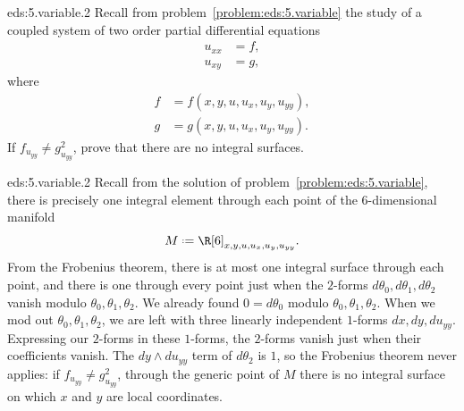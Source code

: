 \begin{problem*}{eds:5.variable.2}
Recall from problem~\vref{problem:eds:5.variable} the study of a coupled system of two  order partial differential equations
\begin{align*}
u_{xx}&=f,\\
u_{xy}&=g,
\end{align*}
where
\begin{align*}
f&=f(x,y,u,u_x,u_y,u_{yy}),\\
g&=g(x,y,u,u_x,u_y,u_{yy}).
\end{align*}
If \(f_{u_{yy}}\ne g_{u_{yy}}^2\), prove that there are no integral surfaces.
\end{problem*}
\begin{answer}{eds:5.variable.2}
Recall from the solution of problem~\vref{problem:eds:5.variable}, there is precisely one integral element through each point of the \(6\)-dimensional manifold
\[
M\defeq\R[6]_{x,y,u,u_x,u_y,u_{yy}}.
\]
From the Frobenius theorem, there is at most one integral surface through each point, and there is one through every point just when the \(2\)-forms \(d\theta_0,d\theta_1,d\theta_2\) vanish modulo \(\theta_0,\theta_1,\theta_2\).
We already found \(0=d\theta_0\) modulo \(\theta_0,\theta_1,\theta_2\).
When we mod out \(\theta_0,\theta_1,\theta_2\), we are left with three linearly independent \(1\)-forms \(dx,dy,du_{yy}\).
Expressing our \(2\)-forms in these \(1\)-forms, the \(2\)-forms vanish just when their coefficients vanish.
The \(dy\wedge du_{yy}\) term of \(d\theta_2\) is \(1\), so the Frobenius theorem never applies: if \(f_{u_{yy}}\ne g_{u_{yy}}^2\), through the generic point of \(M\) there is no integral surface on which \(x\) and \(y\) are local coordinates.
\end{answer}

